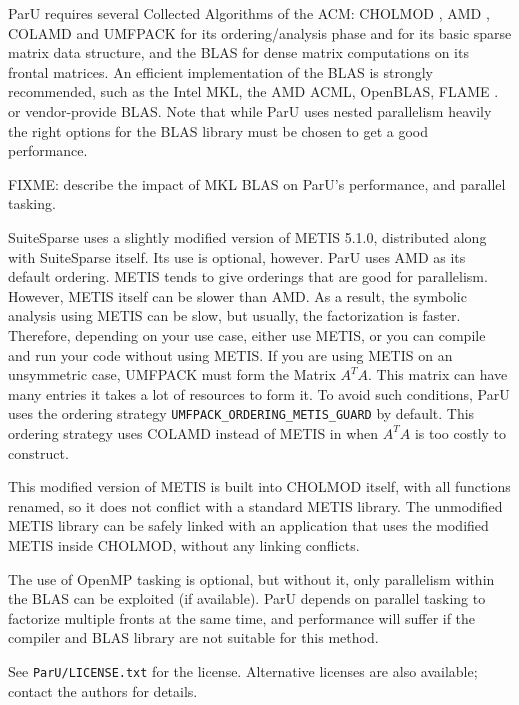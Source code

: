 \documentclass[12pt]{article}
\begin{document}
ParU requires several Collected Algorithms of the ACM:
CHOLMOD \cite{ChenDavisHagerRajamanickam09,DavisHager09},
AMD \cite{AmestoyDavisDuff96,AmestoyDavisDuff03},
COLAMD \cite{DavisGilbertLarimoreNg00_algo,DavisGilbertLarimoreNg00}
and UMFPACK \cite{10.1145/992200.992206} for its ordering/analysis phase and
for its basic sparse matrix data structure, and the BLAS \cite{dddh:90} for
dense matrix computations on its frontal matrices.  An efficient implementation
of the BLAS is strongly recommended, such as the Intel MKL, the AMD ACML,
OpenBLAS, FLAME \cite{GotoVanDeGeijn08}. or vendor-provide BLAS. Note that
while ParU uses nested parallelism heavily the right options for the BLAS
library must be chosen to get a good performance.

FIXME: describe the impact of MKL BLAS on ParU's performance, and
parallel tasking.

SuiteSparse uses a slightly modified version of METIS 5.1.0, distributed along
with SuiteSparse itself.  Its use is optional, however. ParU uses AMD as its
default ordering. METIS tends to give orderings that are good for parallelism.
However, METIS itself can be slower than AMD. As a result, the symbolic
analysis using METIS can be slow, but usually, the factorization is faster.
Therefore, depending on your use case, either use METIS, or you can compile and
run your code without using METIS.  If you are using METIS on an unsymmetric
case, UMFPACK must form the Matrix $A^{T}A$. This matrix can have many entries
it takes a lot of resources to form it. To avoid such conditions, ParU uses the
ordering strategy \verb'UMFPACK_ORDERING_METIS_GUARD' by default.  This
ordering strategy uses COLAMD instead of METIS in when $A^T A$ is too costly to
construct.

This modified version of METIS is built into CHOLMOD itself, with all
functions renamed, so it does not conflict with a standard METIS library.
The unmodified METIS library can be safely linked with an application that
uses the modified METIS inside CHOLMOD, without any linking conflicts.

The use of OpenMP tasking is optional, but without it, only parallelism within
the BLAS can be exploited (if available).  ParU depends on parallel tasking to
factorize multiple fronts at the same time, and performance will suffer if the
compiler and BLAS library are not suitable for this method.

See \verb'ParU/LICENSE.txt' for the license.  Alternative licenses are also
available; contact the authors for details.




\end{document}
